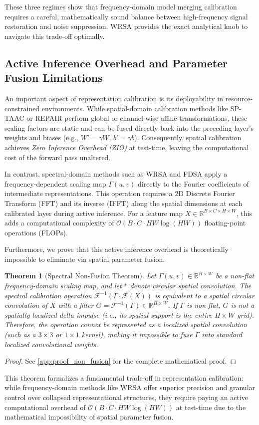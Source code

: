 \documentclass{article}
\theoremstyle{plain}
\newtheorem{theorem}{Theorem}[section]
\theoremstyle{definition}
\theoremstyle{remark}
\begin{document}
These three regimes show that frequency-domain model merging calibration requires a careful, mathematically sound balance between high-frequency signal restoration and noise suppression. WRSA provides the exact analytical knob to navigate this trade-off optimally.

\subsection{Active Inference Overhead and Parameter Fusion Limitations}
An important aspect of representation calibration is its deployability in resource-constrained environments. While spatial-domain calibration methods like SP-TAAC \cite{submission9} or REPAIR \cite{jordan2022repair} perform global or channel-wise affine transformations, these scaling factors are static and can be fused directly back into the preceding layer's weights and biases (e.g., $W' = \gamma W$, $b' = \gamma b$). Consequently, spatial calibration achieves \emph{Zero Inference Overhead (ZIO)} at test-time, leaving the computational cost of the forward pass unaltered.

In contrast, spectral-domain methods such as WRSA and FDSA apply a frequency-dependent scaling map $\Gamma(u, v)$ directly to the Fourier coefficients of intermediate representations. This operation requires a 2D Discrete Fourier Transform (FFT) and its inverse (IFFT) along the spatial dimensions at each calibrated layer during active inference. For a feature map $X \in \mathbb{R}^{B \times C \times H \times W}$, this adds a computational complexity of $\mathcal{O}(B \cdot C \cdot H W \log(H W))$ floating-point operations (FLOPs).

Furthermore, we prove that this active inference overhead is theoretically impossible to eliminate via spatial parameter fusion.
\begin{theorem}[Spectral Non-Fusion Theorem]
  Let $\Gamma(u, v) \in \mathbb{R}^{H \times W}$ be a non-flat frequency-domain scaling map, and let $*$ denote circular spatial convolution. The spectral calibration operation $\mathcal{F}^{-1}(\Gamma \cdot \mathcal{F}(X))$ is equivalent to a spatial circular convolution of $X$ with a filter $G = \mathcal{F}^{-1}(\Gamma) \in \mathbb{R}^{H \times W}$. If $\Gamma$ is non-flat, $G$ is not a spatially localized delta impulse (i.e., its spatial support is the entire $H \times W$ grid). Therefore, the operation cannot be represented as a localized spatial convolution (such as a $3 \times 3$ or $1 \times 1$ kernel), making it impossible to fuse $\Gamma$ into standard localized convolutional weights.
\end{theorem}
\begin{proof}
  See \cref{app:proof_non_fusion} for the complete mathematical proof.
\end{proof}
This theorem formalizes a fundamental trade-off in representation calibration: while frequency-domain methods like WRSA offer superior precision and granular control over collapsed representational structures, they require paying an active computational overhead of $\mathcal{O}(B \cdot C \cdot H W \log(H W))$ at test-time due to the mathematical impossibility of spatial parameter fusion.
\end{document}
